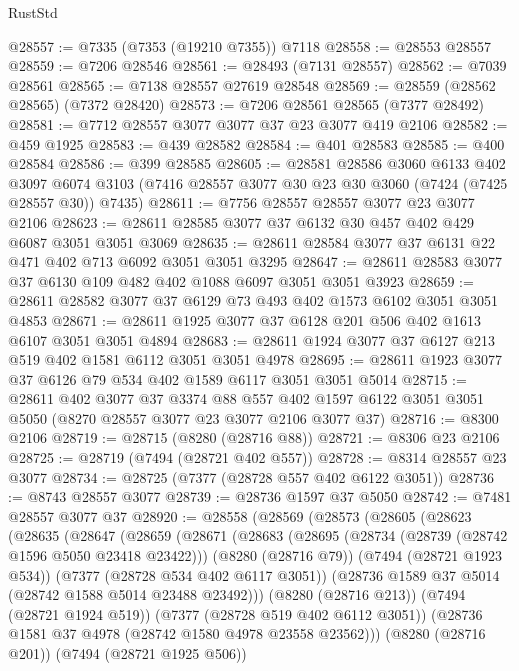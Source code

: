 \begin{lexlean}{RustStd}
\begin{coremodule}
@28557 := @7335 (@7353 (@19210 @7355)) @7118
@28558 := @28553 @28557
@28559 := @7206 @28546
@28561 := @28493 (@7131 @28557)
@28562 := @7039 @28561
@28565 := @7138 @28557 @27619 @28548
@28569 := @28559 (@28562 @28565) (@7372 @28420)
@28573 := @7206 @28561 @28565 (@7377 @28492)
@28581 := @7712 @28557 @3077 @3077 @37 @23 @3077 @419 @2106
@28582 := @459 @1925
@28583 := @439 @28582
@28584 := @401 @28583
@28585 := @400 @28584
@28586 := @399 @28585
@28605 := @28581
    @28586
    @3060
    @6133
    @402
    @3097
    @6074
    @3103
    (@7416 @28557 @3077 @30 @23 @30 @3060 (@7424 (@7425 @28557 @30)) @7435)
@28611 := @7756 @28557 @28557 @3077 @23 @3077 @2106
@28623 := @28611 @28585 @3077 @37 @6132 @30 @457 @402 @429 @6087 @3051 @3051 @3069
@28635 := @28611 @28584 @3077 @37 @6131 @22 @471 @402 @713 @6092 @3051 @3051 @3295
@28647 := @28611 @28583 @3077 @37 @6130 @109 @482 @402 @1088 @6097 @3051 @3051 @3923
@28659 := @28611 @28582 @3077 @37 @6129 @73 @493 @402 @1573 @6102 @3051 @3051 @4853
@28671 := @28611 @1925 @3077 @37 @6128 @201 @506 @402 @1613 @6107 @3051 @3051 @4894
@28683 := @28611 @1924 @3077 @37 @6127 @213 @519 @402 @1581 @6112 @3051 @3051 @4978
@28695 := @28611 @1923 @3077 @37 @6126 @79 @534 @402 @1589 @6117 @3051 @3051 @5014
@28715 := @28611
    @402
    @3077
    @37
    @3374
    @88
    @557
    @402
    @1597
    @6122
    @3051
    @3051
    @5050
    (@8270 @28557 @3077 @23 @3077 @2106 @3077 @37)
@28716 := @8300 @2106
@28719 := @28715 (@8280 (@28716 @88))
@28721 := @8306 @23 @2106
@28725 := @28719 (@7494 (@28721 @402 @557))
@28728 := @8314 @28557 @23 @3077
@28734 := @28725 (@7377 (@28728 @557 @402 @6122 @3051))
@28736 := @8743 @28557 @3077
@28739 := @28736 @1597 @37 @5050
@28742 := @7481 @28557 @3077 @37
@28920 := @28558
    (@28569
      (@28573
        (@28605
          (@28623
            (@28635
              (@28647
                (@28659
                  (@28671
                    (@28683
                      (@28695
                        (@28734 (@28739 (@28742 @1596 @5050 @23418 @23422)))
                        (@8280 (@28716 @79))
                        (@7494 (@28721 @1923 @534))
                        (@7377 (@28728 @534 @402 @6117 @3051))
                        (@28736 @1589 @37 @5014 (@28742 @1588 @5014 @23488 @23492)))
                      (@8280 (@28716 @213))
                      (@7494 (@28721 @1924 @519))
                      (@7377 (@28728 @519 @402 @6112 @3051))
                      (@28736 @1581 @37 @4978 (@28742 @1580 @4978 @23558 @23562)))
                    (@8280 (@28716 @201))
                    (@7494 (@28721 @1925 @506))

\end{coremodule}
\end{lexlean}
